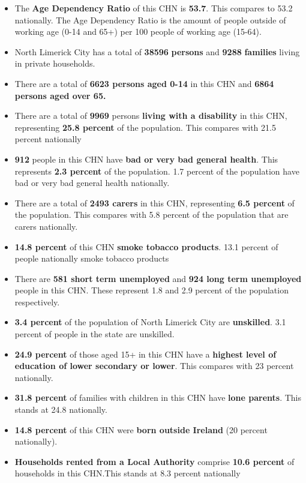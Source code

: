 \documentclass{article}
\begin{document}
\begin{itemize}

\item The \textbf{Age Dependency Ratio} of this CHN is  \textbf{53.7}. This compares to 53.2 nationally. The Age Dependency Ratio is the amount of people outside of working age (0-14 and 65+) per 100 people of working age (15-64). 

\item North Limerick City has a total of \textbf{\num{38596}} \textbf{persons} and  \textbf{\num{9288}} \textbf{families} living in private households.

\item There are a total of \textbf{\num{6623} persons aged 0-14} in this CHN and \textbf{\num{6864} persons aged over 65.} 

\item There are a total of \textbf{\num{9969}} persons \textbf{living with a disability} in this CHN, representing \textbf{25.8 percent} of the population. This compares with  21.5 percent nationally

\item \textbf{\num{912}} people in this CHN have \textbf{bad or very bad general health}. This represents \textbf{2.3 percent} of the population. 1.7 percent of the population have bad or very bad general health nationally. 

\item There are a total of \textbf{\num{2493} carers} in this CHN, representing \textbf{6.5 percent} of the population. This compares with 5.8 percent of the population that are carers nationally. 

\item \textbf{14.8 percent} of this CHN \textbf{smoke tobacco products}. 13.1 percent of people nationally smoke tobacco products

\item There are \textbf{\num{581} short term unemployed} and \textbf{\num{924} long term unemployed} people in this CHN. These represent 1.8 and 2.9 percent of the population respectively.

\item  \textbf{3.4 percent} of the population of North Limerick City are \textbf{unskilled}. 3.1 percent of people in the state are unskilled.

\item \textbf{24.9 percent} of those aged 15+ in this CHN have a \textbf{highest level of education of lower secondary or lower}. This compares with 23 percent nationally. 

\item \textbf{31.8 percent} of families with children in this CHN have \textbf{lone parents}. This stands at 24.8 nationally.

\item \textbf{14.8 percent} of this CHN were \textbf{born outside Ireland} (20 percent nationally).

\item \textbf{Households rented from a Local Authority} comprise \textbf{10.6 percent} of households in this CHN.This stands at 8.3 percent nationally

\end{itemize}
\end{document}
